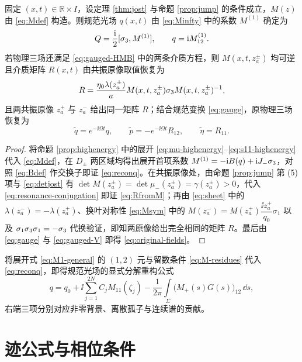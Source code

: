 \begin{proposition}\label{prop:reconstruction}
固定 $(x,t)\in\mathbb R\times I$，设定理 \ref{thm:jost} 与命题 \ref{prop:jump} 的条件成立，$M(z)$ 由 \eqref{eq:Mdef} 构造。则规范光场 $q(x,t)$ 由 \eqref{eq:Minfty} 中的系数 $M^{(1)}$ 确定为
\begin{equation}\label{eq:reconq}
Q=\dfrac{\mathrm{i}}{2}[\sigma_3,M^{(1)}],\qquad q=\mathrm{i} M^{(1)}_{12}.
\end{equation}
若物理三场还满足 \eqref{eq:gauged-HMB} 中的两条介质方程，则 $M(x,t,z_a^\pm)$ 均可逆且介质矩阵 $R(x,t)$ 由共振原像取值恢复为
\begin{equation}\label{eq:RfromM}
R=\dfrac{\eta_0\lambda(z_a^\pm)}{a}M(x,t,z_a^\pm)\sigma_3 M(x,t,z_a^\pm)^{-1},
\end{equation}
且两共振原像 $z_a^+$ 与 $z_a^-$ 给出同一矩阵 $R$；结合规范变换 \eqref{eq:gauge}，原物理三场恢复为
\begin{equation}\label{eq:original-fields}
\widetilde q=e^{-\ii\Omega t}q,\qquad
\widetilde p=-e^{-\ii\Omega t}R_{12},\qquad
\widetilde\eta=R_{11}.
\end{equation}
\end{proposition}
\begin{proof}
将命题 \ref{prop:highenergy} 中的展开 \eqref{eq:mu-highenergy}--\eqref{eq:s11-highenergy} 代入 \eqref{eq:Mdef}，在 $D_\pm$ 两区域均得出展开首项系数 $M^{(1)}=-\mathrm{i} B(q)+\mathrm{i} J_-\sigma_3$，对照 \eqref{eq:Bdef} 作交换子即证 \eqref{eq:reconq}。在共振原像处，由命题 \ref{prop:jump} 第 (5) 项与 \eqref{eq:detjost} 有 $\det M(z_a^\pm)=\det\mu_-(z_a^\pm)=\gamma(z_a^\pm)>0$，代入 \eqref{eq:resonance-conjugation} 即证 \eqref{eq:RfromM}；再由 \eqref{eq:sheet} 中的 $\lambda(z_a^-)=-\lambda(z_a^+)$、换叶对称性 \eqref{eq:Msym} 中的 $M(z_a^-)=M(z_a^+)\dfrac{\ii z_a^+}{q_0}\sigma_1$ 以及 $\sigma_1\sigma_3\sigma_1=-\sigma_3$ 代换验证，即知两原像给出完全相同的矩阵 $R$。最后由 \eqref{eq:gauge} 与 \eqref{eq:gauged-V} 即得 \eqref{eq:original-fields}。
\end{proof}

将展开式 \eqref{eq:M1-general} 的 $(1,2)$ 元与留数条件 \eqref{eq:M-residues} 代入 \eqref{eq:reconq}，即得规范光场的显式分解重构公式
\begin{equation}\label{eq:qgeneral}
q=q_0+\ii\sum\limits_{j=1}^{2N}C_jM_{11}(\zeta_j)
-\dfrac{1}{2\pi}\int\limits_\Sigma \bigl(M_+(s)G(s)\bigr)_{12}\,\dd s,
\end{equation}
右端三项分别对应非零背景、离散孤子与连续谱的贡献。

\section{迹公式与相位条件}

